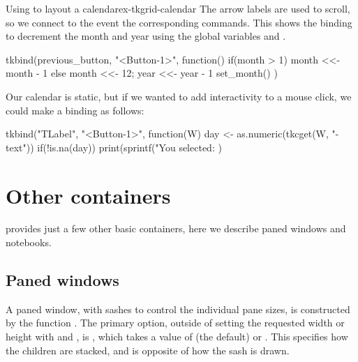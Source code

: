 \begin{example}{Using  to layout a calendar}{ex-tkgrid-calendar}
The arrow labels are used to scroll, so we connect to the
 event the corresponding commands. This shows the
binding to decrement the month and year using the global variables
 and .
\begin{Schunk}
\begin{Sinput}
 tkbind(previous_button, "<Button-1>", function() {
   if(month > 1) {
     month <<- month - 1
   } else {
     month <<- 12; year <<- year - 1
   }
   set_month()
 })
\end{Sinput}
\end{Schunk}


Our calendar is static, but if we wanted to add interactivity to a
mouse click, we could make a binding as follows:
  
\begin{Schunk}
\begin{Sinput}
 tkbind("TLabel", "<Button-1>", function(W) {
   day <- as.numeric(tkcget(W, "-text"))
   if(!is.na(day))
     print(sprintf("You selected: %
 })
\end{Sinput}
\end{Schunk}


\end{example}

\section{Other containers}
\label{sec:tcltk:other-containers}
\TK\/ provides just a few other basic containers, here we describe paned windows and notebooks.

\subsection{Paned windows}
\label{sec:tcltk:paned-windows}

A paned window, with sashes to control the individual pane sizes, is constructed by the function
. The primary option, outside of setting
the requested width or height with  and
, is ,
which takes a value of  (the default) or
. This specifies how the children are stacked, and
is opposite of how the sash is drawn.

